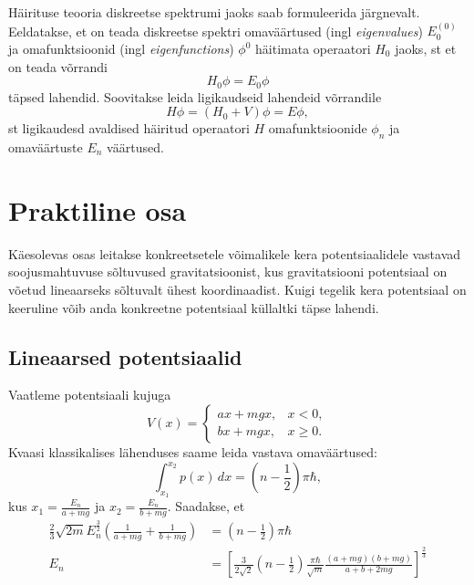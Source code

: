 \documentclass{trkut}%
\begin{document}
Häirituse teooria diskreetse spektrumi jaoks saab formuleerida järgnevalt. Eeldatakse, et on teada diskreetse spektri omaväärtused (ingl  \textit{eigenvalues}) \(E_0^{(0)}\) ja omafunktsioonid (ingl \textit{eigenfunctions}) \(\phi^0\) häitimata operaatori \(H_0\) jaoks, st et on teada võrrandi
\begin{equation}
    H_0 \phi=E_0 \phi
\end{equation}
täpsed lahendid. Soovitakse leida ligikaudseid lahendeid võrrandile
\begin{equation}
    H \phi=(H_0+V)\phi=E\phi,
\end{equation}
st ligikaudesd avaldised häiritud operaatori \(H\) omafunktsioonide \(\phi_n\) ja omaväärtuste \(E_n\) väärtused.

\chapter{Praktiline osa}

Käesolevas osas leitakse konkreetsetele võimalikele kera potentsiaalidele vastavad soojusmahtuvuse sõltuvused gravitatsioonist, kus gravitatsiooni potentsiaal on võetud lineaarseks sõltuvalt ühest koordinaadist. Kuigi tegelik kera potentsiaal on keeruline võib anda konkreetne potentsiaal küllaltki täpse lahendi.

\section{Lineaarsed potentsiaalid}
Vaatleme potentsiaali kujuga 
\begin{equation}
    V(x)=\begin{cases}
        ax+mgx, & x<0,\\
        bx+mgx, & x\ge0.
    \end{cases}
\end{equation}
Kvaasi klassikalises lähenduses saame leida vastava omaväärtused:
\begin{equation}
    \int_{x_1}^{x_2} p(x)\, dx=\left( n-\frac{1}{2}\right)\pi \hbar,
\end{equation}
kus \(x_1=\frac{E_n}{a+mg}\) ja \(x_2=\frac{E_n}{b+mg}\). Saadakse, et 
\begin{align}
    \frac{2}{3}\sqrt{2m} E_n^{\frac{3}{2}} (\frac{1}{a+mg}+\frac{1}{b+mg}) &= \left(n-\frac{1}{2}\right) \pi \hbar\\
    E_n &=\left[\frac{3}{2\sqrt{2}} \left(n-\frac{1}{2}\right) \frac{\pi \hbar}{\sqrt{m}} \frac{(a+mg)(b+mg)}{a+b+2mg}\right]^{\frac{2}{3}}
\end{align}
\end{document}
